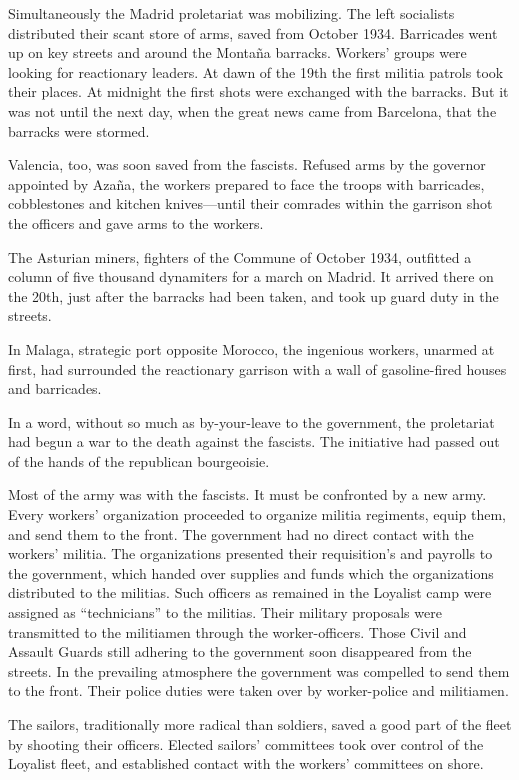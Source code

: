 Simultaneously the Madrid proletariat was mobilizing. The left socialists distributed their scant store of arms, saved from October 1934. Barricades went up on key streets and around the Montaña barracks. Workers’ groups were looking for reactionary leaders. At dawn of the 19th the first militia patrols took their places. At midnight the first shots were exchanged with the barracks. But it was not until the next day, when the great news came from Barcelona, that the barracks were stormed.

Valencia, too, was soon saved from the fascists. Refused arms by the governor appointed by Azaña, the workers prepared to face the troops with barricades, cobblestones and kitchen knives---until their comrades within the garrison shot the officers and gave arms to the workers.

The Asturian miners, fighters of the Commune of October 1934, outfitted a column of five thousand dynamiters for a march on Ma\-drid. It arrived there on the 20th, just after the barracks had been taken, and took up guard duty in the streets.
\nowidow

In Malaga, strategic port opposite Morocco, the ingenious workers, unarmed at first, had surrounded the reactionary garrison with a wall of gasoline-fired houses and barricades.

In a word, without so much as by-your-leave to the government, the proletariat had begun a war to the death against the fascists. The initiative had passed out of the hands of the republican bourgeoisie.

Most of the army was with the fascists. It must be confronted by a new army. Every workers’ organization proceeded to organize militia regiments, equip them, and send them to the front. The government had no direct contact with the workers’ militia. The organizations presented their requisition’s and payrolls to the government, which handed over supplies and funds which the organizations distributed to the militias. Such officers as remained in the Loyalist camp were assigned as ``technicians'' to the militias. Their military proposals were transmitted to the militiamen through the worker-officers. Those Civil and Assault Guards still adhering to the government soon disappeared from the streets. In the prevailing atmosphere the government was compelled to send them to the front. Their police duties were taken over by worker-police and militiamen.

The sailors, traditionally more radical than soldiers, saved a good part of the fleet by shooting their officers. Elected sailors’ committees took over control of the Loyalist fleet, and established contact with the workers’ committees on shore.

